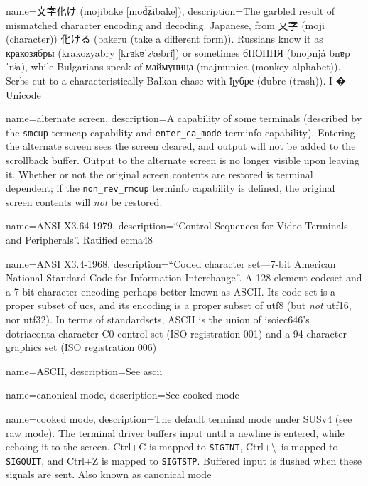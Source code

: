 {
  name={文字化け (mojibake [{mod͡ʑibake}])},
  description={The garbled result of mismatched
    character encoding and decoding. Japanese, from 文字 (moji (character))
    化ける (bakeru (take a different form)). Russians know it as \textrussian{кракозя́бры}
    (krakozyabry [{krɐkɐˈzʲæbrɪ̈}]) or sometimes
    \textrussian{бНОПНЯ} (bnopnjá {bnɐpˈnʲa}), while Bulgarians speak of \textbulgarian{маймуница}
    (majmunica (monkey alphabet)). Serbs cut to a characteristically
    Balkan chase with \textrussian{ђубре} (đubre (trash)). I {�} Unicode}
}

{
  name={alternate screen},
  description={A capability of some terminals (described by the \texttt{smcup}
    termcap capability and \texttt{enter\_ca\_mode} terminfo capability). 
    Entering the alternate screen sees the screen cleared, and output will not
    be added to the scrollback buffer. Output to the alternate screen is no
    longer visible upon leaving it. Whether or not the original screen contents
    are restored is terminal dependent; if the \texttt{non\_rev\_rmcup}
    terminfo capability is defined, the original screen contents will \textit{not}
    be restored.}
}

{
  name={ANSI X3.64-1979},
  description={``Control Sequences for Video Terminals and Peripherals''.
    Ratified \Gls{ecma48}}
}

{
  name={ANSI X3.4-1968},
  description={``Coded character set---7-bit American National Standard Code
    for Information Interchange''. A 128-element codeset and a 7-bit character
    encoding perhaps better known as ASCII\cite{ascii}. Its code set is a
    proper subset of \Gls{ucs}, and its encoding is a proper subset of
    \gls{utf8} (but \textit{not} \gls{utf16}, nor \gls{utf32}). In terms of
    \gls{standardsets}, ASCII is the union of \Gls{isoiec646}'s
    dotriaconta-character \Gls{C0} control set (ISO registration 001) and
    a 94-character graphics set (ISO registration 006)}
}

{
  name={ASCII},
  description={See \Gls{ascii}}
}

{
  name={canonical mode},
  description={See \gls{cooked mode}}
}

{
  name={cooked mode},
description={The default terminal mode under SUSv4 (see \gls{raw mode}).
  The terminal driver buffers input until a newline is entered, while echoing
  it to the screen. Ctrl+C is mapped to \texttt{SIGINT}, Ctrl+\textbackslash\ is
  mapped to \texttt{SIGQUIT}, and Ctrl+Z is mapped to \texttt{SIGTSTP}.
  Buffered input is flushed when these signals are sent. Also known as
  \gls{canonical mode}}
}

